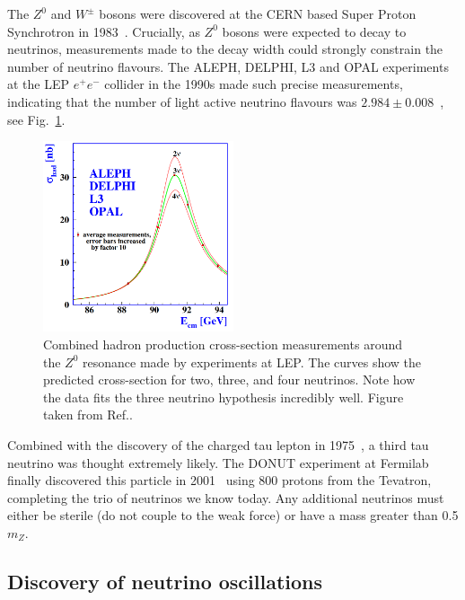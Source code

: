 The $Z^{0}$ and $W^{\pm}$ bosons were discovered at the CERN based Super Proton Synchrotron in
1983~\cite{arnison1983_z,arnison1983_w}. Crucially, as $Z^{0}$ bosons were expected to decay to
neutrinos, measurements made to the decay width could strongly constrain the number of neutrino
flavours. The ALEPH, DELPHI, L3 and OPAL experiments at the LEP $e^{+}e^{-}$ collider in the 1990s
made such precise measurements, indicating that the number of light active neutrino flavours was
$2.984\pm0.008$~\cite{electroweak2006}, see Fig.~\ref{fig:z_resonance}.

\begin{figure} %
    \includegraphics[origin=c,width=0.5\textwidth]{diagrams/3-theory/z_resonance.png}
    \caption[Hadron production cross-section measurements from LEP]
    {Combined hadron production cross-section measurements around the $Z^{0}$ resonance made by
        experiments at LEP. The curves show the predicted cross-section for two, three, and four
        neutrinos. Note how the data fits the three neutrino hypothesis incredibly well. Figure
        taken from Ref.\cite{electroweak2006}.}
    \label{fig:z_resonance}
\end{figure}

Combined with the discovery of the charged tau lepton in 1975~\cite{perl1975}, a third tau
neutrino was thought extremely likely. The DONUT experiment at Fermilab finally discovered this
particle in 2001~\cite{Kodama2001} using \unit{800}{\GeV} protons from the Tevatron, completing
the trio of neutrinos we know today. Any additional neutrinos must either be sterile (do not
couple to the weak force) or have a mass greater than 0.5 $m_{Z}$.

\subsection{Discovery of neutrino oscillations} %
\label{sec:theory_history_osc} %


